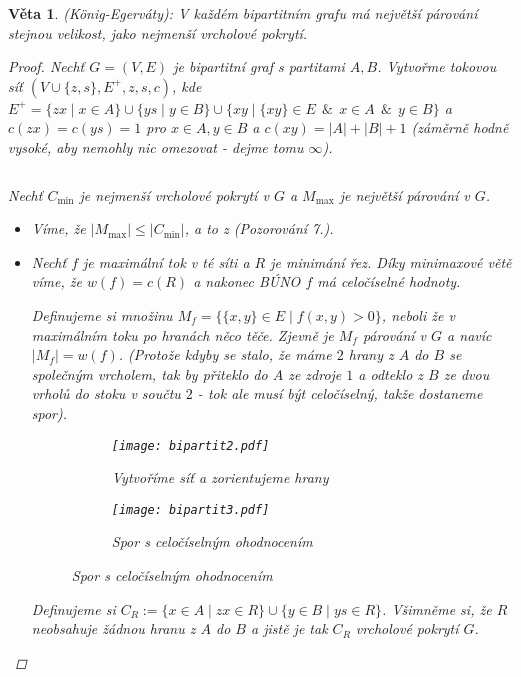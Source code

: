 \documentclass[10pt,a4paper]{article}
\newtheorem{veta}{Věta}
\newcommand\makesmall{\fontsize{8pt}{11pt}\selectfont}
\begin{document}
\newpage
\begin{veta} (König-Egerváty): \normalfont
    V každém bipartitním grafu má největší párování stejnou velikost, jako nejmenší vrcholové pokrytí.
    \begin{proof}
        Nechť $G=(V, E)$ je bipartitní graf s partitami $A, B$. Vytvořme tokovou síť $(V \cup \{z,s\}, E^+, z,s,c)$, kde $E^+=\{zx \mid x\in A\} \cup \{ys \mid y\in B\} \cup \{xy \mid \{xy\} \in E ~~\&~~ x\in A ~~\&~~ y\in B\}$ a $c(zx)=c(ys)=1$ pro $x\in A, y\in B$ a $c(xy)=|A|+|B|+1$ (záměrně hodně vysoké, aby nemohly nic omezovat - dejme tomu $\infty$).

        $ $

        Nechť $C_{\min}$ je nejmenší vrcholové pokrytí v $G$ a $M_{\max}$ je největší párování v $G$.
        
        \begin{itemize}
            \item Víme, že $|M_{\max}| \leq |C_{\min}|$, a to z \textit{(Pozorování 7.)}.   
            \item Nechť $f$ je maximální tok v té síti a $R$ je minimání řez. Díky \textit{minimaxové větě} víme, že $w(f)=c(R)$ a nakonec BÚNO $f$ má celočíselné hodnoty.

        Definujeme si množinu $M_f = \{\{x,y\}\in E \mid f(x,y)>0\}$, neboli že v maximálním toku po hranách něco těče. 
        Zjevně je $M_f$ párování v $G$ a navíc $|M_f| = w(f)$. \textit{(Protože kdyby se stalo, že máme $2$ hrany z $A$ do $B$ se společným vrcholem, tak by přiteklo do $A$ ze zdroje $1$ a odteklo z $B$ ze dvou vrholů do stoku v součtu $2$ - tok ale musí být celočíselný, takže dostaneme spor).}
        \begin{figure}[ht!]
            \caption{\makesmall\textit{Příklad bipartitního grafu.}}
            \centering
            \begin{subfigure}[b]{.35\textwidth}
                \texttt{[image: bipartit2.pdf]}
                \caption{\textit{Vytvoříme síť a zorientujeme hrany}}
            \end{subfigure}
            \begin{subfigure}[b]{.35\textwidth}
                \texttt{[image: bipartit3.pdf]}
                \caption{\textit{Spor s celočíselným ohodnocením}}
            \end{subfigure}
        \end{figure}
        
        Definujeme si $C_R:= \{x\in A \mid zx \in R\} \cup \{y\in B\mid ys \in R\}$. Všimněme si, že $R$ neobsahuje žádnou hranu z $A$ do $B$ a jistě je tak $C_R$ vrcholové pokrytí $G$.


\end{itemize}
\end{proof}
\end{veta}
\end{document}
